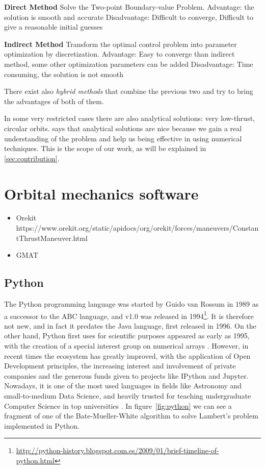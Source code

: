 \textbf{Direct Method}
Solve the Two-point Boundary-value Problem.
Advantage: the solution is smooth and accurate
Disadvantage: Difficult to converge, Difficult to give a reasonable initial guesses 

\textbf{Indirect Method}
Transform the optimal control problem into parameter 
optimization by discretization.
Advantage: Easy to converge than indirect method, some other optimization parameters can be added
Disadvantage: Time consuming, the solution is not smooth 

There exist also \textit{hybrid methods} that combine the previous two and try to bring the advantages of both of them.

In some very restricted cases there are also analytical solutions: very low-thrust, circular orbits. \cite{lawden1963optimal} says that analytical solutions are nice because we gain a real understanding of the problem and help us being effective in using numerical techniques. This is the scope of our work, as will be explained in \ref{sec:contribution}.

\section{Orbital mechanics software}

\begin{itemize}
\item Orekit https://www.orekit.org/static/apidocs/org/orekit/forces/maneuvers/ConstantThrustManeuver.html
\item GMAT 
\end{itemize}

\subsection{Python} \label{sec:python}

The Python programming language was started by Guido van Rossum in 1989 as a successor to the ABC language, and v1.0 was released in 1994\footnote{\url{http://python-history.blogspot.com.es/2009/01/brief-timeline-of-python.html}}. It is therefore not new, and in fact it predates the Java language, first released in 1996. On the other hand, Python first uses for scientific purposes appeared as early as 1995, with the creation of a special interest group on numerical arrays \cite{millman2011python}. However, in recent times the ecosystem has greatly improved, with the application of Open Development principles, the increasing interest and involvement of private companies and the generous funds given to projects like IPython \cite{perez2007ipython} and Jupyter. Nowadays, it is one of the most used languages in fields like Astronomy \cite{momcheva2015software} and small-to-medium Data Science, and heavily trusted for teaching undergraduate Computer Science in top universities \cite{guo2014python}. In figure~\ref{fig:python} we can see a fragment of one of the Bate-Mueller-White algorithm to solve Lambert's problem implemented in Python.

